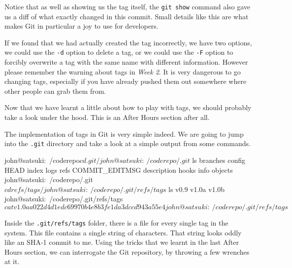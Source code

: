 Notice that as well as showing us the tag itself, the \texttt{git show} command also gave us a diff of what exactly changed in this commit.  Small details like this are what makes Git in particular a joy to use for developers.

If we found that we had actually created the tag incorrectly, we have two options, we could use the \texttt{-d} option to delete a tag, or we could use the \texttt{-F} option to forcibly overwrite a tag with the same name with different information.  However please remember the warning about tags in \emph{Week 2}.  It is very dangerous to go changing tags, especially if you have already pushed them out somewhere where other people can grab them from.

Now that we have learnt a little about how to play with tags, we should probably take a look under the hood.  This is an After Hours section after all.

The implementation of tags in Git is very simple indeed.  We are going to jump into the \texttt{.git} directory and take a look at a simple output from some commands.

\begin{code}
john@satsuki:~/coderepo$ cd .git/
john@satsuki:~/coderepo/.git$ ls
branches        config       HEAD   index  logs     refs
COMMIT_EDITMSG  description  hooks  info   objects
john@satsuki:~/coderepo/.git$ cd refs/tags/
john@satsuki:~/coderepo/.git/refs/tags$ ls
v0.9  v1.0a  v1.0b
john@satsuki:~/coderepo/.git/refs/tags$ cat v1.0a
a022d4d1edc69970b4e8b3fe1da3dccd943a55e4
john@satsuki:~/coderepo/.git/refs/tags$ 
\end{code}

Inside the \texttt{.git/refs/tags} folder, there is a file for every single tag in the system.  This file contains a single string of characters.  That string looks oddly like an SHA-1 commit to me.  Using the tricks that we learnt in the last After Hours section, we can interrogate the Git repository, by throwing a few wrenches at it.


